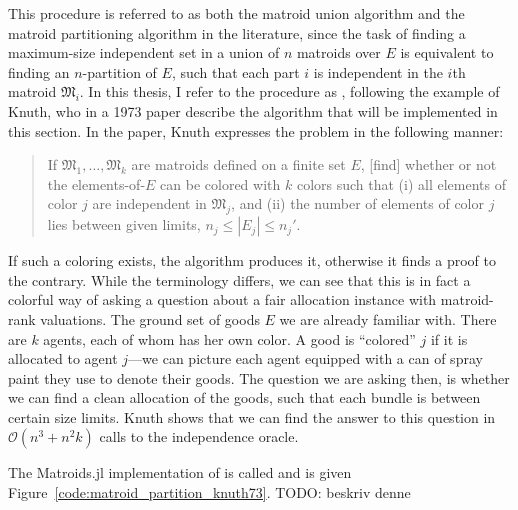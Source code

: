 This procedure is referred to as both the matroid union algorithm and the matroid partitioning algorithm in the literature, since the task of finding a maximum-size independent set in a union of $n$ matroids over $E$ is equivalent to finding an $n$-partition of $E$, such that each part $i$ is independent in the $i$th matroid $\mathfrak{M}_i$. In this thesis, I refer to the procedure as , following the example of Knuth, who in a 1973 paper describe the algorithm that will be implemented in this section. In the paper, Knuth expresses the problem in the following manner: 
\begin{quote}
  If $\mathfrak{M}_1,\dots,\mathfrak{M}_k$ are matroids defined on a finite set $E$, [find] whether or not the elements-of-$E$ can be colored with $k$ colors such that (i) all elements of color $j$ are independent in $\mathfrak{M}_j$, and (ii) the number of elements of color $j$ lies between given limits, $n_j\leq |E_j| \leq n_j'$.~\cite{knuth1973matroidpartitioning}
\end{quote}
If such a coloring exists, the algorithm produces it, otherwise it finds a proof to the contrary. While the terminology differs, we can see that this is in fact a colorful way of asking a question about a fair allocation instance with matroid-rank valuations. The ground set of goods $E$ we are already familiar with. There are $k$ agents, each of whom has her own color. A good is ``colored'' $j$ if it is allocated to agent $j$---we can picture each agent equipped with a can of spray paint they use to denote their goods. The question we are asking then, is whether we can find a clean allocation of the goods, such that each bundle is between certain size limits. Knuth shows that we can find the answer to this question in $\mathcal{O}(n^3 + n^2k)$ calls to the independence oracle.

The Matroids.jl implementation of  is called\linebreak{} and is given Figure~\ref{code:matroid_partition_knuth73}. TODO: beskriv denne
\skelpar

